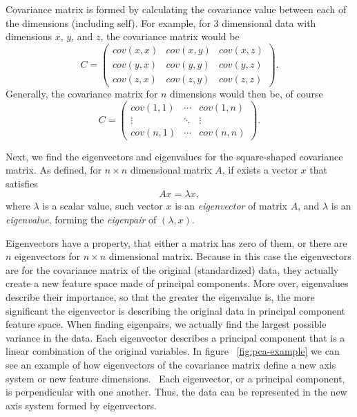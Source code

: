 Covariance matrix is formed
by calculating the covariance value between each of the dimensions (including self).
For example,
for 3 dimensional data with dimensions $x$, $y$, and $z$, the
covariance matrix would be
\begin{equation}
    C =
    \begin{pmatrix}
        cov(x,x) & cov(x,y) & cov(x,z) \\
        cov(y,x) & cov(y,y) & cov(y,z) \\
        cov(z,x) & cov(z,y) & cov(z,z)
    \end{pmatrix}.
\end{equation}
Generally,
the covariance matrix for $n$ dimensions would then be, of course
\begin{equation}
    C =
    \begin{pmatrix}
        cov(1,1)    & \cdots    & cov(1,n)    \\
        \vdots      & \ddots    & \vdots        \\
        cov(n,1)    & \cdots    & cov(n,n)
    \end{pmatrix}.
\end{equation}

Next, we find the eigenvectors and eigenvalues
for the square-shaped covariance matrix.
As defined,
for $n\times n$ dimensional matrix $A$,
if exists a vector $x$ that satisfies
\begin{equation}
    Ax = \lambda x,
\end{equation}
where $\lambda$ is a scalar value,
such vector $x$ is an \textit{eigenvector} of matrix $A$,
and $\lambda$ is an \textit{eigenvalue},
forming the \textit{eigenpair} of $(\lambda,x)$.~\cite{borm2012numerical}

Eigenvectors have a property,
that either a matrix has zero of them,
or there are $n$ eigenvectors for $n\times n$ dimensional matrix.
Because in this case the eigenvectors are for the covariance matrix of the original (standardized) data,
they actually create a new feature space made of principal components.
More over,
eigenvalues describe their importance,
so that the greater the eigenvalue is,
the more significant the eigenvector is describing the original data
in principal component feature space.
When finding eigenpairs,
we actually find the largest possible variance in the data.
Each eigenvector describes a principal component
that is a linear combination of the original variables.
In figure ~\ref{fig:pca-example} we can see an example of
how eigenvectors of the covariance matrix define a new axis system
or new feature dimensions.~\cite{zhu2019dimension}
Each eigenvector, or a principal component,
is perpendicular with one another.
Thus, the data can be represented
in the new axis system formed by eigenvectors.


